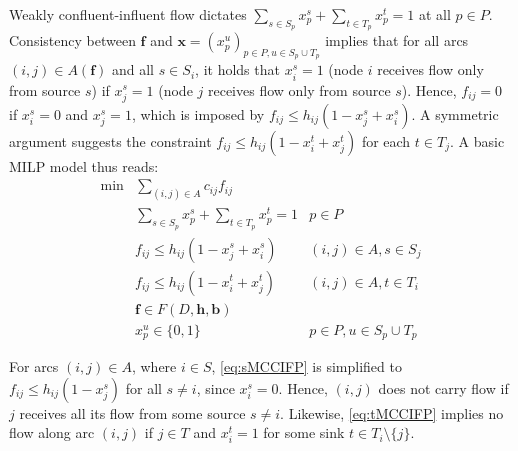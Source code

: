 \documentclass[pdflatex,sn-mathphys-num]{sn-jnl}%
\theoremstyle{thmstyleone}%
\begin{document}
Weakly confluent-influent flow dictates $\sum_{s\in S_p}x_p^s+\sum_{t\in T_p}x_p^t=1$ at all $p\in P$.
Consistency between $\boldsymbol{f}$ and $\boldsymbol{x}=\left(x_p^u\right)_{p\in P, u\in S_p\cup T_p}$ implies that for all arcs $(i,j)\in A(\boldsymbol{f})$
and all $s\in S_i$, it holds that $x_i^s=1$ (node $i$ receives flow only from source $s$) if $x_j^s=1$
(node $j$ receives flow only from source $s$).
Hence, $f_{ij}=0$ if $x_i^s=0$ and $x_j^s=1$, which is imposed by $f_{ij}\leq h_{ij}\left(1-x_j^s+x_i^s\right)$.
A symmetric argument suggests the constraint $f_{ij}\leq h_{ij}\left(1-x_i^t+x_j^t\right)$ for each $t\in T_j$.
A basic MILP model thus reads:
\begin{eqnarray}
\min & \sum_{(i,j)\in A}c_{ij}f_{ij} \label{eq:objMCCIFP} \\
     & \sum_{s\in S_p}x_p^s+\sum_{t\in T_p}x_p^t = 1 & p\in P \label{eq:convMCCIFP} \\
     & f_{ij}\leq h_{ij}\left(1-x_j^s+x_i^s\right) & (i,j)\in A, s\in S_j \label{eq:sMCCIFP} \\
     & f_{ij}\leq h_{ij}\left(1-x_i^t+x_j^t\right) & (i,j)\in A, t\in T_i \label{eq:tMCCIFP} \\
     & \boldsymbol{f}\in F(D,\boldsymbol{h},\boldsymbol{b}) \label{eq:fMCCIFP} \\
     & x_p^u\in\{0,1\} & p\in P, u\in S_p\cup T_p \label{eq:xMCCIFP}
\end{eqnarray}

For arcs $(i,j)\in A$, where $i\in S$, \eqref{eq:sMCCIFP} is simplified to $f_{ij}\leq h_{ij}(1-x_j^s)$ for all $s\neq i$, since $x_i^s=0$.
Hence, $(i,j)$ does not carry flow if $j$ receives all its flow from some source $s\neq i$.
Likewise, \eqref{eq:tMCCIFP} implies no flow along arc $(i,j)$ if $j\in T$ and $x_i^t=1$ for some sink $t\in T_i\setminus\{j\}$.
\end{document}
